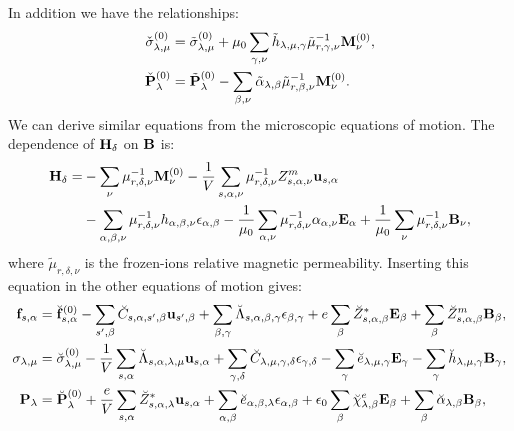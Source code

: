 \documentclass[12pt,a4paper,twoside]{report}
\begin{document}
In addition we have the relationships:
\begin{align}
\check \sigma^{(0)}_{\lambda,\mu} &= \tilde \sigma^{(0)}_{\lambda,\mu}
+ \mu_0 \sum_{\gamma,\nu} \tilde h_{\lambda,\mu,\gamma} 
\tilde \mu^{-1}_{r,\gamma,\nu} {\bf M}^{(0)}_\nu,  \\
\check {\bf P}^{(0)}_{\lambda} &= \tilde {\bf P}^{(0)}_{\lambda}
- \sum_{\beta,\nu} \tilde \alpha_{\lambda,\beta} 
\tilde \mu^{-1}_{r,\beta,\nu} {\bf M}^{(0)}_\nu. 
\end{align}
We can derive similar equations from the microscopic equations of motion.
The dependence of ${\bf H}_\delta$ on ${\bf B}$ is:
\begin{align}
{\bf H}_\delta = 
&- \sum_\nu \mu^{-1}_{r,\delta,\nu} {\bf M}^{(0)}_\nu 
-{1\over V} \sum_{s,\alpha,\nu} \mu^{-1}_{r,\delta,\nu} Z^m_{s,\alpha,\nu}
{\bf u}_{s,\alpha} \nonumber\\
&- \sum_{\alpha,\beta,\nu} \mu^{-1}_{r,\delta,\nu} h_{\alpha,\beta,\nu}
\epsilon_{\alpha,\beta} - {1\over \mu_0} \sum_{\alpha,\nu}
\mu^{-1}_{r,\delta,\nu} \alpha_{\alpha,\nu} {\bf E}_\alpha
+ {1\over \mu_0} \sum_\nu \mu^{-1}_{r,\delta,\nu} {\bf B}_\nu, 
\end{align}
where $\tilde \mu_{r,\delta,\nu}$ is the frozen-ions relative magnetic
permeability.
Inserting this equation in the other equations of motion gives:
\begin{align}
{\bf f}_{s,\alpha}&= \breve{\bf f}^{(0)}_{s,\alpha}
-\sum_{s',\beta} \breve C_{s,\alpha,s',\beta} {\bf u}_{s',\beta}
+\sum_{\beta,\gamma}
\breve \Lambda_{s,\alpha,\beta,\gamma} 
\epsilon_{\beta,\gamma} +
e \sum_{\beta} \breve Z^*_{s,\alpha,\beta} {\bf E}_{\beta}
+\sum_{\beta} 
\breve Z^m_{s,\alpha,\beta} {\bf B}_{\beta}, \\
\sigma_{\lambda,\mu}&= \breve  \sigma_{\lambda,\mu}^{(0)}
-{1\over V} \sum_{s,\alpha}
\breve \Lambda_{s,\alpha,\lambda,\mu} {\bf u}_{s,\alpha}
+\sum_{\gamma,\delta} \breve C_{\lambda,\mu,\gamma,\delta}  
\epsilon_{\gamma,\delta} -
\sum_{\gamma} \breve e_{\lambda,\mu,\gamma} 
 {\bf E}_{\gamma}
-\sum_{\gamma}  \breve h_{\lambda,\mu,\gamma} 
{\bf B}_{\gamma}, \\
{\bf P}_{\lambda}&=  \breve {\bf P}^{(0)}_{\lambda}
+{e\over V} \sum_{s,\alpha} \breve Z^*_{s,\alpha,\lambda} 
{\bf u}_{s,\alpha} +
\sum_{\alpha,\beta} \breve e_{\alpha,\beta,\lambda} 
\epsilon_{\alpha,\beta} +
\epsilon_0 \sum_{\beta} 
\breve \chi^e_{\lambda,\beta}
{\bf E}_{\beta} +
\sum_{\beta} \breve \alpha_{\lambda,\beta} 
{\bf B}_{\beta}, 
\end{align}
\end{document}
